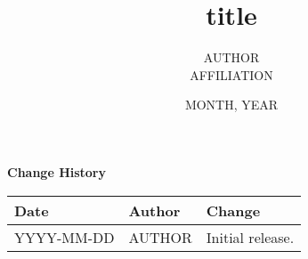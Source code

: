


%

\title{title}
\author{AUTHOR\\AFFILIATION}
\date{MONTH, YEAR}



\maketitle

\draftwatermark

\thispagestyle{empty}
\vspace*{10cm}
\begin{center}
  {\sffamily\Large\bfseries Change History}
  \begin{table}[htp]
    \centering
    \begin{tabular}{|p{2cm}|p{3cm}|p{8cm}|}
      \hline
      \sffamily\textbf{Date} & \sffamily\textbf{Author} & \sffamily\textbf{Change}\\
      \hline\hline
      YYYY-MM-DD & AUTHOR & Initial release.\\
      \hline
    \end{tabular}
  \end{table}
\end{center}
\clearpage
{}
\setcounter{page}{1}


%

\clearpage




%



